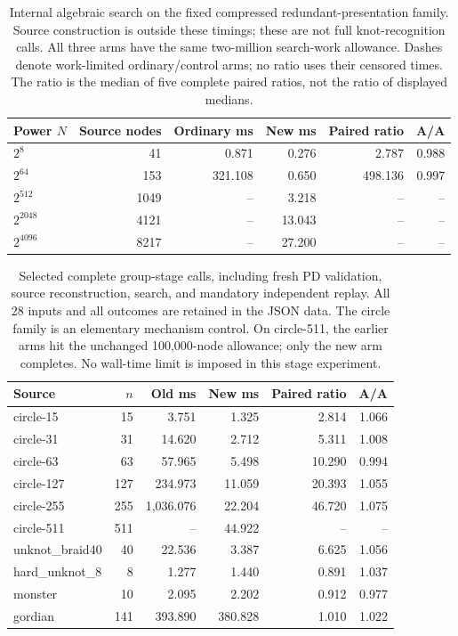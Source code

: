 \begin{table}[htbp]
\centering\small
\begin{tabular}{lrrrrr}
\toprule
Power $N$ & Source nodes & Ordinary ms & New ms & Paired ratio & A/A \\
\midrule
$2^{8}$ & 41 & 0.871 & 0.276 & 2.787 & 0.988 \\
$2^{64}$ & 153 & 321.108 & 0.650 & 498.136 & 0.997 \\
$2^{512}$ & 1049 & -- & 3.218 & -- & -- \\
$2^{2048}$ & 4121 & -- & 13.043 & -- & -- \\
$2^{4096}$ & 8217 & -- & 27.200 & -- & -- \\
\bottomrule
\end{tabular}
\caption{Internal algebraic search on the fixed compressed redundant-presentation family. Source construction is outside these timings; these are not full knot-recognition calls. All three arms have the same two-million search-work allowance. Dashes denote work-limited ordinary/control arms; no ratio uses their censored times. The ratio is the median of five complete paired ratios, not the ratio of displayed medians.}
\label{tab:raw-saturation-kernels}
\end{table}

\begin{table}[htbp]
\centering\small
\begin{tabular}{lrrrrr}
\toprule
Source & $n$ & Old ms & New ms & Paired ratio & A/A \\
\midrule
circle-15 & 15 & 3.751 & 1.325 & 2.814 & 1.066 \\
circle-31 & 31 & 14.620 & 2.712 & 5.311 & 1.008 \\
circle-63 & 63 & 57.965 & 5.498 & 10.290 & 0.994 \\
circle-127 & 127 & 234.973 & 11.059 & 20.393 & 1.055 \\
circle-255 & 255 & 1,036.076 & 22.204 & 46.720 & 1.075 \\
circle-511 & 511 & -- & 44.922 & -- & -- \\
unknot\_braid40 & 40 & 22.536 & 3.387 & 6.625 & 1.056 \\
hard\_unknot\_8 & 8 & 1.277 & 1.440 & 0.891 & 1.037 \\
monster & 10 & 2.095 & 2.202 & 0.912 & 0.977 \\
gordian & 141 & 393.890 & 380.828 & 1.010 & 1.022 \\
\bottomrule
\end{tabular}
\caption{Selected complete group-stage calls, including fresh PD validation, source reconstruction, search, and mandatory independent replay. All 28 inputs and all outcomes are retained in the JSON data. The circle family is an elementary mechanism control. On circle-511, the earlier arms hit the unchanged 100,000-node allowance; only the new arm completes. No wall-time limit is imposed in this stage experiment.}
\label{tab:raw-saturation-stage}
\end{table}

